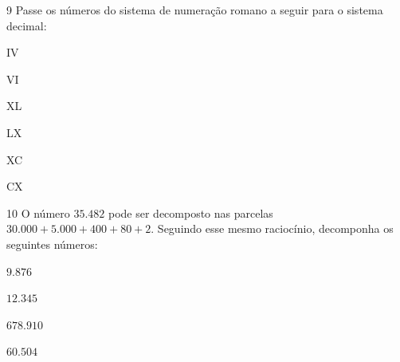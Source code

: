 
\num{9}  Passe os números do sistema de numeração romano a seguir para o
sistema decimal:

\begin{escolha}
\item IV 
\item VI 
\item XL 
\item LX 
\item XC 
\item CX 
\end{escolha}

\num{10}  O número $35.482$ pode ser decomposto nas parcelas $30.000 + 5.000 +
400 + 80 + 2$. Seguindo esse mesmo raciocínio, decomponha os seguintes
números:

\begin{escolha}
\item $9.876$ 
\item $12.345$ 
\item $678.910$ 
\item $60.504$ 
\end{escolha}


